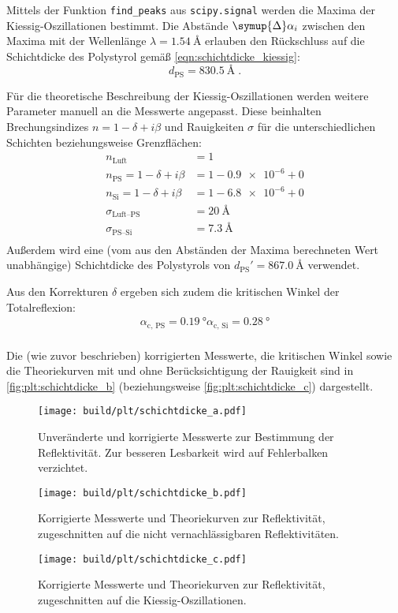 Mittels der Funktion \texttt{find\_peaks} aus \texttt{scipy.signal} werden die Maxima der Kiessig-Oszillationen bestimmt.
Die Abstände $\symup{\Delta} \alpha_i$ zwischen den Maxima
mit der Wellenlänge $\lambda = \SI{1.54}{\angstrom}$
erlauben den Rückschluss auf die Schichtdicke des Polystyrol gemäß \autoref{eqn:schichtdicke_kiessig}:
\[
    d_\text{PS} = \SI{830.5}{\angstrom} \; .
\]

Für die theoretische Beschreibung der Kiessig-Oszillationen werden weitere Parameter manuell an die Messwerte angepasst.
Diese beinhalten Brechungsindizes $n = 1 - \delta + i\beta$ und Rauigkeiten $\sigma$
für die unterschiedlichen Schichten beziehungsweise Grenzflächen:
\begin{align*}
    n_\text{Luft} &= 1 \\
    n_\text{PS} = 1 - \delta + i\beta &= 1 - \num{0.9e-6} + 0 \\
    n_\text{Si} = 1 - \delta + i\beta &= 1 - \num{6.8e-6} + 0 \\
    \sigma_\text{Luft–PS} &= \SI{20}{\angstrom} \\
    \sigma_\text{PS–Si} &= \SI{7.3}{\angstrom} \\
\end{align*}
Außerdem wird eine (vom aus den Abständen der Maxima berechneten Wert unabhängige) Schichtdicke des Polystyrols von
$d_\text{PS}' = \SI{867.0}{\angstrom}$ verwendet.

Aus den Korrekturen $\delta$ ergeben sich zudem die kritischen Winkel der Totalreflexion:
\begin{align*}
    \alpha_\text{c, PS} = \SI{0.19}{\degree}
    \alpha_\text{c, Si} = \SI{0.28}{\degree} \\
\end{align*}

Die (wie zuvor beschrieben) korrigierten Messwerte,
die kritischen Winkel
sowie die Theoriekurven mit und ohne Berücksichtigung der Rauigkeit
sind in \autoref{fig:plt:schichtdicke_b}
    (beziehungsweise \autoref{fig:plt:schichtdicke_c})
dargestellt.


\begin{figure}
    \centering
    \texttt{[image: build/plt/schichtdicke\_a.pdf]}
    \caption{
        Unveränderte und korrigierte Messwerte zur Bestimmung der Reflektivität.
        Zur besseren Lesbarkeit wird auf Fehlerbalken verzichtet.
    }
    \label{fig:plt:schichtdicke_a}
\end{figure}
\begin{figure}
    \centering
    \texttt{[image: build/plt/schichtdicke\_b.pdf]}
    \caption{
        Korrigierte Messwerte und Theoriekurven zur Reflektivität,
        zugeschnitten auf die nicht vernachlässigbaren Reflektivitäten.
    }
    \label{fig:plt:schichtdicke_b}
\end{figure}

\begin{figure}
    \centering
    \texttt{[image: build/plt/schichtdicke\_c.pdf]}
    \caption{
        Korrigierte Messwerte und Theoriekurven zur Reflektivität,
        zugeschnitten auf die Kiessig-Oszillationen.
    }
    \label{fig:plt:schichtdicke_c}
\end{figure}
